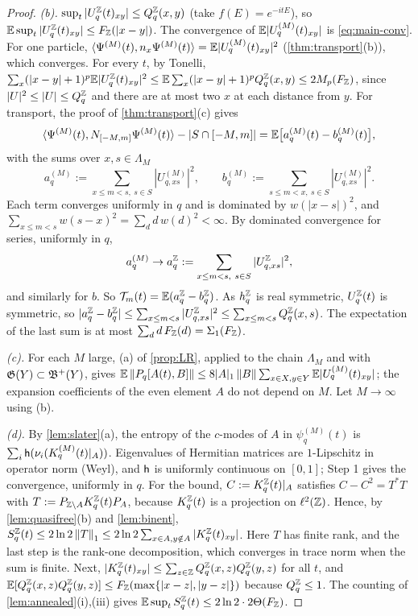 \begin{proof}
\emph{(b).}  $\sup_t|U^{\mathbb{Z}}_q(t)_{xy}|\le Q^{\mathbb{Z}}_q(x,y)$ (take $f(E)=e^{-itE}$), so
$\mathbb{E}\sup_t|U^{\mathbb{Z}}_q(t)_{xy}|\le F_{\mathbb{Z}}(|x-y|)$.  The convergence of $\mathbb{E}|U^{(M)}_q(t)_{xy}|$ is \eqref{eq:main-conv}.  For one
particle, $\langle\Psi^{(M)}(t),n_x\Psi^{(M)}(t)\rangle=\mathbb{E}|U^{(M)}_q(t)_{xy}|^2$ (\cref{thm:transport}(b)), which converges.
For every $t$, by Tonelli,
$\sum_x(|x-y|+1)^p\mathbb{E}|U^{\mathbb{Z}}_q(t)_{xy}|^2\le\mathbb{E}\sum_x(|x-y|+1)^pQ^{\mathbb{Z}}_q(x,y)\le2M_p(F_{\mathbb{Z}})$, since $|U|^2\le|U|\le Q^{\mathbb{Z}}_q$ and
there are at most two $x$ at each distance from $y$.  For transport, the proof of \cref{thm:transport}(c) gives
\[
  \langle\Psi^{(M)}(t),N_{[-M,m]}\Psi^{(M)}(t)\rangle-|S\cap[-M,m]|=\mathbb{E}\bigl[a^{(M)}_q(t)-b^{(M)}_q(t)\bigr],
\]
with the sums over $x,s\in\Lambda_M$
\[
  a^{(M)}_q:=\sum_{x\le m<s,\ s\in S}|U^{(M)}_{q,xs}|^2,\qquad b^{(M)}_q:=\sum_{s\le m<x,\ s\in S}|U^{(M)}_{q,xs}|^2 .
\]  Each term converges uniformly in $q$ and is dominated by $w(|x-s|)^2$, and
$\sum_{x\le m<s}w(s-x)^2=\sum_dd\,w(d)^2<\infty$.  By dominated convergence for series, uniformly in $q$,
\[
  a^{(M)}_q\to a^\Z_q:=\sum_{x\le m<s,\ s\in S}|U^\Z_{q,xs}|^2,
\]
and similarly for $b$.  So
$\mathcal T_m(t)=\mathbb{E}(a^{\mathbb{Z}}_q-b^{\mathbb{Z}}_q)$.  As $h^{\mathbb{Z}}_q$ is real symmetric, $U^{\mathbb{Z}}_q(t)$ is symmetric, so
$|a^{\mathbb{Z}}_q-b^{\mathbb{Z}}_q|\le\sum_{x\le m<s}|U^{\mathbb{Z}}_{q,xs}|^2\le\sum_{x\le m<s}Q^{\mathbb{Z}}_q(x,s)$.  The expectation of the last sum
is at most $\sum_dd\,F_{\mathbb{Z}}(d)=\Sigma_1(F_{\mathbb{Z}})$.

\emph{(c).}  For each $M$ large, (a) of \cref{prop:LR}, applied to the chain $\Lambda_M$ and with $\mathfrak{G}(Y)\subset\mathfrak{B}^+(Y)$,
gives $\mathbb{E}\left\|P_q[A(t),B]\right\|\le8|A|_1\left\|B\right\|\sum_{x\in X,y\in Y}\mathbb{E}|U^{(M)}_q(t)_{xy}|$; the expansion coefficients of the
even element $A$ do not depend on $M$.  Let $M\to\infty$ using (b).

\emph{(d).}  By \cref{lem:slater}(a), the entropy of the $c$-modes of $A$ in $\psi^{(M)}_q(t)$ is
$\sum_i\mathsf{h}(\nu_i(K^{(M)}_q(t)|_A))$.  Eigenvalues of Hermitian matrices are $1$-Lipschitz in operator norm (Weyl), and
$\mathsf{h}$ is uniformly continuous on $[0,1]$; Step 1 gives the convergence, uniformly in $q$.  For the bound, $C:=K^{\mathbb{Z}}_q(t)|_A$
satisfies $C-C^2=T^*T$ with $T:=P_{\mathbb{Z}\setminus A}K^{\mathbb{Z}}_q(t)P_A$, because $K^{\mathbb{Z}}_q(t)$ is a projection on $\ell^2(\mathbb{Z})$.  Hence,
by \cref{lem:quasifree}(b) and \cref{lem:binent}, $S^{\mathbb{Z}}_q(t)\le2\ln2\left\|T\right\|_1\le2\ln2\sum_{x\in A,y\notin A}|K^{\mathbb{Z}}_q(t)_{xy}|$.
Here $T$ has finite rank, and the last step is the rank-one decomposition, which converges in trace norm when the sum
is finite.  Next, $|K^{\mathbb{Z}}_q(t)_{xy}|\le\sum_{z\in\mathbb{Z}}Q^{\mathbb{Z}}_q(x,z)Q^{\mathbb{Z}}_q(y,z)$ for all $t$, and
$\mathbb{E}[Q^{\mathbb{Z}}_q(x,z)Q^{\mathbb{Z}}_q(y,z)]\le F_{\mathbb{Z}}(\max\{|x-z|,|y-z|\})$ because $Q^{\mathbb{Z}}_q\le1$.  The counting of
\cref{lem:annealed}(i),(iii) gives $\mathbb{E}\sup_tS^{\mathbb{Z}}_q(t)\le2\ln2\cdot2\Theta(F_{\mathbb{Z}})$.


\end{proof}
